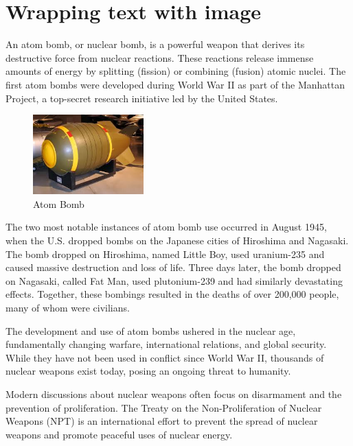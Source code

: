 \documentclass{article}
\begin{document}
\clearpage




\section{Wrapping text with image }
An atom bomb, or nuclear bomb, is a powerful weapon that derives its destructive force from nuclear reactions. These reactions release immense amounts of energy by splitting (fission) or combining (fusion) atomic nuclei. The first atom bombs were developed during World War II as part of the Manhattan Project, a top-secret research initiative led by the United States.
\begin{figure} %
	\centering
	\includegraphics[width=0.38\textwidth]{third.jpg}
	\caption{Atom Bomb}
	\label{fig:wrapfig}
\end{figure}





The two most notable instances of atom bomb use occurred in August 1945, when the U.S. dropped bombs on the Japanese cities of Hiroshima and Nagasaki. The bomb dropped on Hiroshima, named Little Boy, used uranium-235 and caused massive destruction and loss of life. Three days later, the bomb dropped on Nagasaki, called Fat Man, used plutonium-239 and had similarly devastating effects. Together, these bombings resulted in the deaths of over 200,000 people, many of whom were civilians.

The development and use of atom bombs ushered in the nuclear age, fundamentally changing warfare, international relations, and global security. While they have not been used in conflict since World War II, thousands of nuclear weapons exist today, posing an ongoing threat to humanity.

Modern discussions about nuclear weapons often focus on disarmament and the prevention of proliferation. The Treaty on the Non-Proliferation of Nuclear Weapons (NPT) is an international effort to prevent the spread of nuclear weapons and promote peaceful uses of nuclear energy.


	
	
	
	
	
\end{document}
